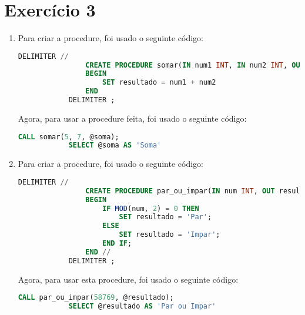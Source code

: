 \documentclass{article}
\begin{document}
\section*{Exercício 3}
    \begin{enumerate}[label=\alph*)]

        \item Para criar a procedure, foi usado o seguinte código:
        \begin{lstlisting}[language=SQL]
            DELIMITER //
                CREATE PROCEDURE somar(IN num1 INT, IN num2 INT, OUT soma INT)
                BEGIN
                    SET resultado = num1 + num2
                END
            DELIMITER ;
        \end{lstlisting}

        Agora, para usar a procedure feita, foi usado o seguinte código:
        \begin{lstlisting}[language=SQL]
            CALL somar(5, 7, @soma);
            SELECT @soma AS 'Soma'
        \end{lstlisting}

        \item Para criar a procedure, foi usado o seguinte código:
        \begin{lstlisting}[language=SQL]
            DELIMITER //
                CREATE PROCEDURE par_ou_impar(IN num INT, OUT resultado VARCHAR(5))
                BEGIN
                    IF MOD(num, 2) = 0 THEN
                        SET resultado = 'Par';
                    ELSE
                        SET resultado = 'Impar';
                    END IF;
                END //
            DELIMITER ;
        \end{lstlisting}

        Agora, para usar esta procedure, foi usado o seguinte código:
        \begin{lstlisting}[language=SQL]
            CALL par_ou_impar(58769, @resultado);
            SELECT @resultado AS 'Par ou Impar'
        \end{lstlisting}

    \end{enumerate}
\end{document}
